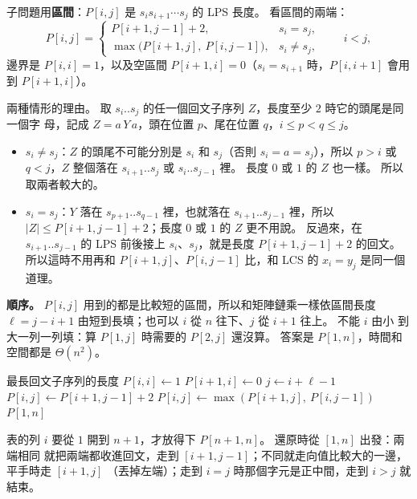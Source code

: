 子問題用\textbf{區間}：$P[i, j]$ 是 $s_i s_{i+1} \cdots s_j$ 的 LPS 長度。 看區間的兩端：
\[
P[i, j] = \begin{cases}
P[i + 1, j - 1] + 2, & s_i = s_j, \\
\max\bigl(P[i + 1, j],\ P[i, j - 1]\bigr), & s_i \ne s_j,
\end{cases}
\qquad i < j,
\]
邊界是 $P[i, i] = 1$，以及空區間 $P[i + 1, i] = 0$（$s_i = s_{i+1}$ 時，$P[i, i+1]$ 會用到
$P[i + 1, i]$）。

兩種情形的理由。 取 $s_i..s_j$ 的任一個回文子序列 $Z$，長度至少 $2$ 時它的頭尾是同一個字
母，記成 $Z = a\,Y\,a$，頭在位置 $p$、尾在位置 $q$，$i \le p < q \le j$。
\begin{itemize}
\item $s_i \ne s_j$：$Z$ 的頭尾不可能分別是 $s_i$ 和 $s_j$（否則 $s_i = a = s_j$），所以
$p > i$ 或 $q < j$，$Z$ 整個落在 $s_{i+1}..s_j$ 或 $s_i..s_{j-1}$ 裡。 長度 $0$ 或 $1$ 的 $Z$
也一樣。 所以取兩者較大的。
\item $s_i = s_j$：$Y$ 落在 $s_{p+1}..s_{q-1}$ 裡，也就落在 $s_{i+1}..s_{j-1}$ 裡，所以
$|Z| \le P[i + 1, j - 1] + 2$；長度 $0$ 或 $1$ 的 $Z$ 更不用說。 反過來，在 $s_{i+1}..s_{j-1}$
的 LPS 前後接上 $s_i$、$s_j$，就是長度 $P[i + 1, j - 1] + 2$ 的回文。 所以這時不用再和
$P[i + 1, j]$、$P[i, j - 1]$ 比，和 LCS 的 $x_i = y_j$ 是同一個道理。
\end{itemize}

\textbf{順序。} $P[i, j]$ 用到的都是比較短的區間，所以和矩陣鏈乘一樣依區間長度
$\ell = j - i + 1$ 由短到長填；也可以 $i$ 從 $n$ 往下、$j$ 從 $i + 1$ 往上。 不能 $i$ 由小
到大一列一列填：算 $P[1, j]$ 時需要的 $P[2, j]$ 還沒算。 答案是 $P[1, n]$，時間和空間都是
$\Theta(n^2)$。

\begin{pseudo}[label=alg:dp-lps]{最長回文子序列的長度}
        \State $P[i, i] \gets 1$
        \State $P[i + 1, i] \gets 0$ 
    \EndFor
     
            \State $j \gets i + \ell - 1$
                \State $P[i, j] \gets P[i + 1, j - 1] + 2$
            \Else
                \State $P[i, j] \gets \max(P[i + 1, j],\ P[i, j - 1])$
            \EndIf
        \EndFor
    \EndFor
    \State \Return $P[1, n]$
\EndFunction
\end{pseudo}

表的列 $i$ 要從 $1$ 開到 $n + 1$，才放得下 $P[n + 1, n]$。 還原時從 $[1, n]$ 出發：兩端相同
就把兩端都收進回文，走到 $[i + 1, j - 1]$；不同就走向值比較大的一邊，平手時走 $[i + 1, j]$
（丟掉左端）；走到 $i = j$ 時那個字元是正中間，走到 $i > j$ 就結束。


